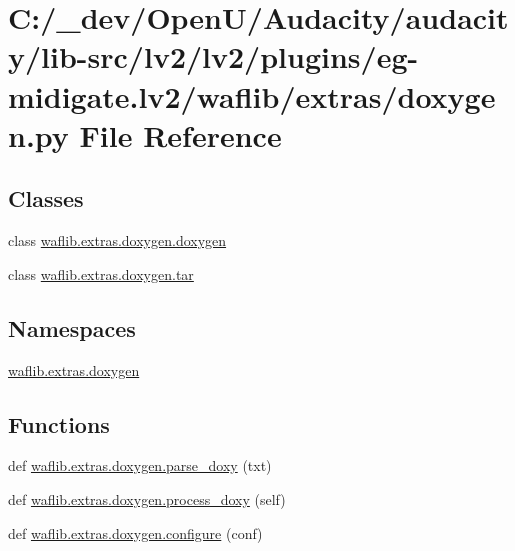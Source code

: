 \hypertarget{lv2_2plugins_2eg-midigate_8lv2_2waflib_2extras_2doxygen_8py}{}\section{C\+:/\+\_\+dev/\+Open\+U/\+Audacity/audacity/lib-\/src/lv2/lv2/plugins/eg-\/midigate.lv2/waflib/extras/doxygen.py File Reference}
\label{lv2_2plugins_2eg-midigate_8lv2_2waflib_2extras_2doxygen_8py}
\subsection*{Classes}
\begin{DoxyCompactItemize}
\item 
class \hyperlink{classwaflib_1_1extras_1_1doxygen_1_1doxygen}{waflib.\+extras.\+doxygen.\+doxygen}
\item 
class \hyperlink{classwaflib_1_1extras_1_1doxygen_1_1tar}{waflib.\+extras.\+doxygen.\+tar}
\end{DoxyCompactItemize}
\subsection*{Namespaces}
\begin{DoxyCompactItemize}
\item 
 \hyperlink{namespacewaflib_1_1extras_1_1doxygen}{waflib.\+extras.\+doxygen}
\end{DoxyCompactItemize}
\subsection*{Functions}
\begin{DoxyCompactItemize}
\item 
def \hyperlink{namespacewaflib_1_1extras_1_1doxygen_ad00d728a0949db6dd441165547e07e7a}{waflib.\+extras.\+doxygen.\+parse\+\_\+doxy} (txt)
\item 
def \hyperlink{namespacewaflib_1_1extras_1_1doxygen_a88b85c6ce6a068c606c3e035e84d8760}{waflib.\+extras.\+doxygen.\+process\+\_\+doxy} (self)
\item 
def \hyperlink{namespacewaflib_1_1extras_1_1doxygen_a172fdeb5aa82f9d3d452b22a5f4abe70}{waflib.\+extras.\+doxygen.\+configure} (conf)
\end{DoxyCompactItemize}
